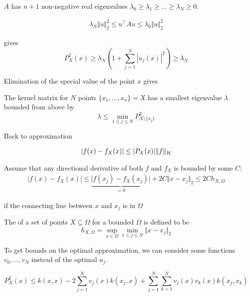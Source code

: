 $A$ has $n+1$ non-negative real eigenvalues $\lambda_0\geq \lambda_1\geq \dots\geq \lambda_N\geq 0$.

\begin{align*}
    \lambda_N\Vert u\Vert_2^2\leq u^\intercal A u\leq \lambda_0\Vert u\Vert_2^2
\end{align*}

gives 
\[P_X^2(x)\geq \lambda_N\left(1+\sum_{j=1}^N |u_j(x)|^2 \right)\geq \lambda_N\]

Elimination of the special value of the point $x$ gives 

\begin{theorem}\label{thm:2.6}
    The kernel matrix for $N$ points $\{x_1,\dots,x_n\}=X$ has a smallest
    eigenvalue $\lambda$ bounded from above by \[\lambda\leq \min_{1\leq j\leq N}P_{X\setminus\{x_j\}}^2\]
\end{theorem}

Back to approximation

\begin{align*}
    \vert f(x)-f_X(x)\vert\leq\vert P_X(x)\vert \Vert f\Vert_{\mathcal{H}}
\end{align*}

Assume that any directional derivative of both $f$ and $f_X$ is bounded 
by some $C$:
\begin{align*}
    \vert f(x)-f_X(x)\vert \leq \underbrace{\vert f(x_j)-f_X(x_j)\vert}_{=0} +2C\Vert x-x_j\Vert_2\leq 2Ch_{X,\Omega} 
\end{align*}

if the connecting line between $x$ and $x_j$ is in $\Omega$ %

\begin{definition}\label{def:2.7:fill_distance}
    The  of a set of points $X\subseteq \Omega$ for a 
    bounded $\Omega$ is defined to be 
    \[h_{X,\Omega}=\sup_{x\in\Omega}\min_{1\leq j\leq N}\Vert x-x_j\Vert_2\]
\end{definition}


To get bounds on the optimal approximation, we can consider 
some functions $v_0,\dots,v_N$ instead of the optimal $u_j$.

\begin{equation}\label{eq:006}
    P_X^2(x)\leq k(x,x)-2\sum_{j=1}^N v_j(x)k(x_j,x)+\sum_{j=1}^{N}\sum_{k=1}^{N}v_j(x)v_k(x)k(x_j,x_k)
\end{equation}

